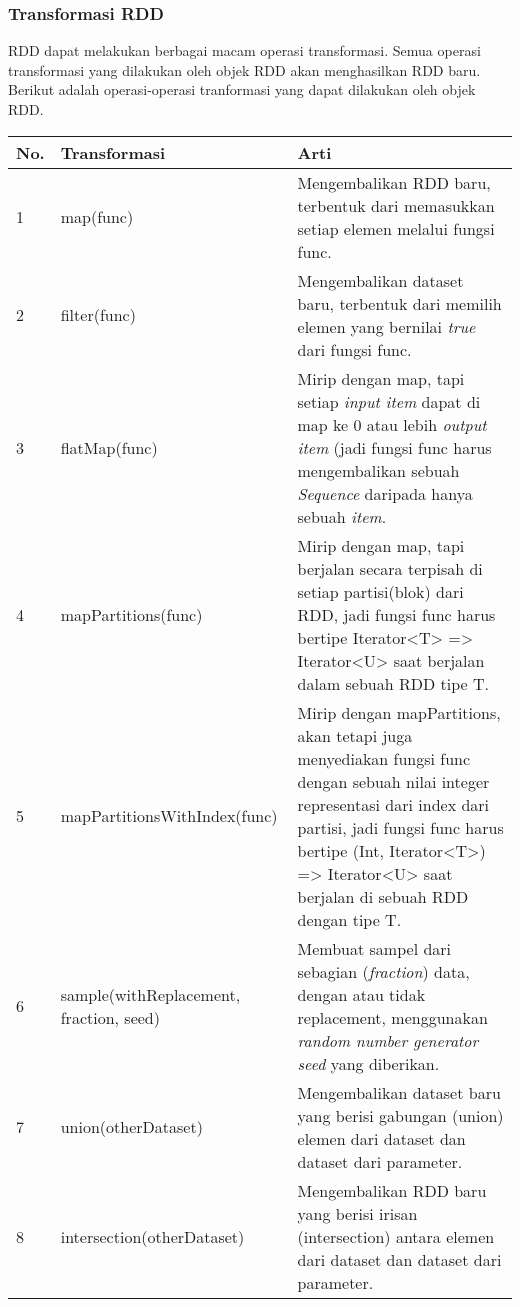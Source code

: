 \subsubsection{Transformasi RDD}
RDD dapat melakukan berbagai macam operasi transformasi. Semua operasi transformasi yang dilakukan oleh objek RDD akan menghasilkan RDD baru. Berikut adalah operasi-operasi tranformasi yang dapat dilakukan oleh objek RDD.\\

\begin{tabular}{|p{}|p{}|p{}|}
\hline 
No. & Transformasi & Arti \\ 
\hline 
1 & map(func) & Mengembalikan RDD baru, terbentuk dari memasukkan setiap elemen melalui fungsi func. \\ 
\hline 
2 & filter(func) & Mengembalikan dataset baru, terbentuk dari memilih elemen yang bernilai \textit{true} dari fungsi func.\\ 
\hline 
3 & flatMap(func) & Mirip dengan map, tapi setiap \textit{input item} dapat di map ke 0 atau lebih \textit{output item} (jadi fungsi func harus mengembalikan sebuah \textit{Sequence} daripada hanya sebuah \textit{item}.\\ 
\hline 
4 & mapPartitions(func) & Mirip dengan map, tapi berjalan secara terpisah di setiap partisi(blok) dari RDD, jadi fungsi func harus bertipe Iterator<T> => Iterator<U> saat berjalan dalam sebuah RDD tipe T.\\ 
\hline 
5 & mapPartitionsWithIndex(func) & Mirip dengan mapPartitions, akan tetapi juga menyediakan fungsi func dengan sebuah nilai integer representasi dari index dari partisi, jadi fungsi func harus bertipe (Int, Iterator<T>) => Iterator<U> saat berjalan di sebuah RDD dengan tipe T. \\ 
\hline 
6 & sample(withReplacement, fraction, seed) & Membuat sampel dari sebagian (\textit{fraction}) data, dengan atau tidak replacement, menggunakan \textit{random number generator seed} yang diberikan.\\ 
\hline 
7 & union(otherDataset) & Mengembalikan dataset baru yang berisi gabungan (union) elemen dari dataset dan dataset dari parameter.\\ 
\hline 
8 & intersection(otherDataset) & Mengembalikan RDD baru yang berisi irisan (intersection) antara elemen dari dataset dan dataset dari parameter.\\ 
\hline 
\end{tabular}


